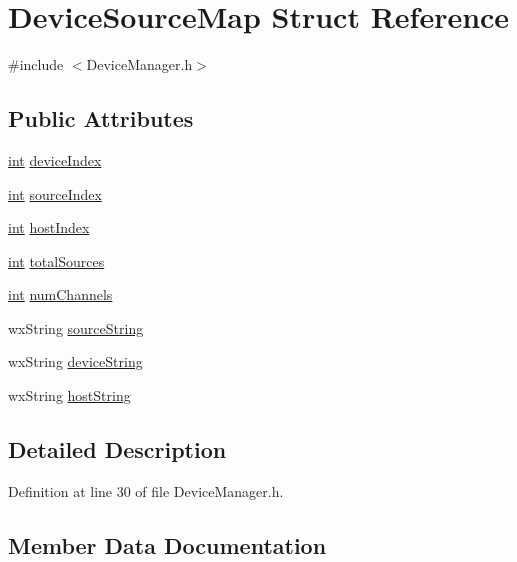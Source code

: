 \hypertarget{struct_device_source_map}{}\section{Device\+Source\+Map Struct Reference}
\label{struct_device_source_map}


{\ttfamily \#include $<$Device\+Manager.\+h$>$}

\subsection*{Public Attributes}
\begin{DoxyCompactItemize}
\item 
\hyperlink{xmltok_8h_a5a0d4a5641ce434f1d23533f2b2e6653}{int} \hyperlink{struct_device_source_map_ac3627f0989e6875e621ff9551797cba4}{device\+Index}
\item 
\hyperlink{xmltok_8h_a5a0d4a5641ce434f1d23533f2b2e6653}{int} \hyperlink{struct_device_source_map_a8929f90f4dcbb822f6410172538ef703}{source\+Index}
\item 
\hyperlink{xmltok_8h_a5a0d4a5641ce434f1d23533f2b2e6653}{int} \hyperlink{struct_device_source_map_a936cec62411bfe3e148c0f4a76a49060}{host\+Index}
\item 
\hyperlink{xmltok_8h_a5a0d4a5641ce434f1d23533f2b2e6653}{int} \hyperlink{struct_device_source_map_abe8670c3c3d98c3bf71fcdba159fd9ae}{total\+Sources}
\item 
\hyperlink{xmltok_8h_a5a0d4a5641ce434f1d23533f2b2e6653}{int} \hyperlink{struct_device_source_map_a3d791c17175702ded8114bc12ae5b283}{num\+Channels}
\item 
wx\+String \hyperlink{struct_device_source_map_a973daa8e8a29fc02e41ab15e931f5544}{source\+String}
\item 
wx\+String \hyperlink{struct_device_source_map_af4ee803ca01c0a420a2af321a10be103}{device\+String}
\item 
wx\+String \hyperlink{struct_device_source_map_a13c9083502eb1ea0866a56679f118071}{host\+String}
\end{DoxyCompactItemize}


\subsection{Detailed Description}


Definition at line 30 of file Device\+Manager.\+h.



\subsection{Member Data Documentation}
